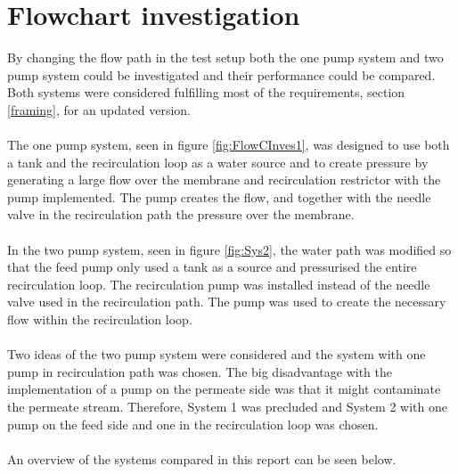 \section{Flowchart investigation}
By changing the flow path in the test setup both the one pump system and two pump system could be investigated and their performance could be compared. Both systems were considered fulfilling most of the requirements, section \ref{framing}, for an updated version. \\
\\
The one pump system, seen in figure \ref{fig:FlowCInves1}, was designed to use both a tank and the recirculation loop as a water source and to create pressure by generating a large flow over the membrane and recirculation restrictor with the pump implemented. The pump creates the flow, and together with the needle valve in the recirculation path the pressure over the membrane.  \\
\\
In the two pump system, seen in figure \ref{fig:Sys2}, the water path was modified so that the feed pump only used a tank as a source and pressurised the entire recirculation loop. The recirculation pump was installed instead of the needle valve used in the recirculation path. The pump was used to create the necessary flow within the recirculation loop.\\
\\
Two ideas of the two pump system were considered and the system with one pump in recirculation path was chosen. The big disadvantage with the implementation of a pump on the permeate side was that it might contaminate the permeate stream. Therefore, System 1 was precluded and System 2 with one pump on the feed side and one in the recirculation loop was chosen.\\
\\
An overview of the systems compared in this report can be seen below.\\
